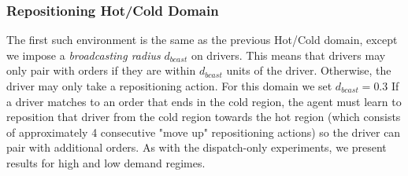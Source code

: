 \subsubsection{Repositioning Hot/Cold Domain} The first such environment is the same as the previous Hot/Cold domain, except we impose a {\em broadcasting radius} $d_{bcast}$ on drivers. This means that drivers may only pair with orders if they are within $d_{bcast}$ units of the driver. Otherwise, the driver may only take a repositioning action. For this domain we set $d_{bcast}=0.3$ If a driver matches to an order that ends in the cold region, the agent must learn to reposition that driver from the cold region towards the hot region (which consists of approximately 4 consecutive "move up" repositioning actions) so the driver can pair with additional orders. As with the dispatch-only experiments, we present results for high and low demand regimes.
% 
% 
\begin{center}
\begin{table}
\caption{Hot/Cold with repositioning}
\end{table}
\end{center}

